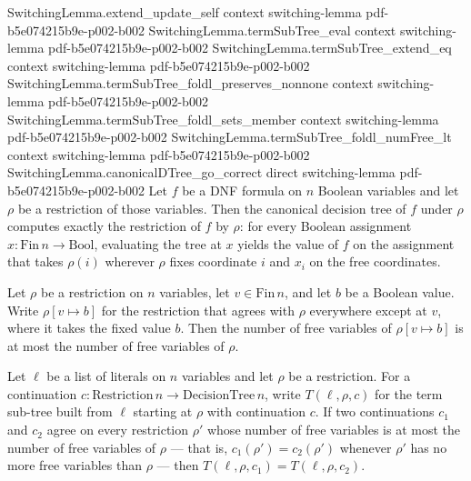 \begin{lemma}
\proofstep
  {SwitchingLemma.extend_update_self}
  {context}
  {switching-lemma}
  {pdf-b5e074215b9e-p002-b002}
\proofstep
  {SwitchingLemma.termSubTree_eval}
  {context}
  {switching-lemma}
  {pdf-b5e074215b9e-p002-b002}
\proofstep
  {SwitchingLemma.termSubTree_extend_eq}
  {context}
  {switching-lemma}
  {pdf-b5e074215b9e-p002-b002}
\proofstep
  {SwitchingLemma.termSubTree_foldl_preserves_nonnone}
  {context}
  {switching-lemma}
  {pdf-b5e074215b9e-p002-b002}
\proofstep
  {SwitchingLemma.termSubTree_foldl_sets_member}
  {context}
  {switching-lemma}
  {pdf-b5e074215b9e-p002-b002}
\proofstep
  {SwitchingLemma.termSubTree_foldl_numFree_lt}
  {context}
  {switching-lemma}
  {pdf-b5e074215b9e-p002-b002}
\proofstep
  {SwitchingLemma.canonicalDTree_go_correct}
  {direct}
  {switching-lemma}
  {pdf-b5e074215b9e-p002-b002}
Let $f$ be a DNF formula on $n$ Boolean variables and let $\rho$ be a restriction of
those variables. Then the canonical decision tree of $f$ under $\rho$ computes exactly
the restriction of $f$ by $\rho$: for every Boolean assignment $x : \mathrm{Fin}\,n \to
\mathrm{Bool}$, evaluating the tree at $x$ yields the value of $f$ on the assignment
that takes $\rho(i)$ wherever $\rho$ fixes coordinate $i$ and $x_i$ on the free
coordinates.
\end{lemma}

\begin{lemma}
\label{SwitchingLemma.numFree_update_le}
\leanok
{}
Let $\rho$ be a restriction on $n$ variables, let $v \in \mathrm{Fin}\,n$, and let $b$
be a Boolean value. Write $\rho[v \mapsto b]$ for the restriction that agrees with
$\rho$ everywhere except at $v$, where it takes the fixed value $b$. Then the number of
free variables of $\rho[v \mapsto b]$ is at most the number of free variables of $\rho$.
\end{lemma}

\begin{lemma}
\label{SwitchingLemma.termSubTree_cont_congr}
\leanok
{}
Let $\ell$ be a list of literals on $n$ variables and let $\rho$ be a restriction. For a
continuation $c : \mathrm{Restriction}\,n \to \mathrm{DecisionTree}\,n$, write $T(\ell,
\rho, c)$ for the term sub-tree built from $\ell$ starting at $\rho$ with continuation
$c$. If two continuations $c_1$ and $c_2$ agree on every restriction $\rho'$ whose
number of free variables is at most the number of free variables of $\rho$ — that is,
$c_1(\rho') = c_2(\rho')$ whenever $\rho'$ has no more free variables than $\rho$ — then
$T(\ell, \rho, c_1) = T(\ell, \rho, c_2)$.
\end{lemma}

